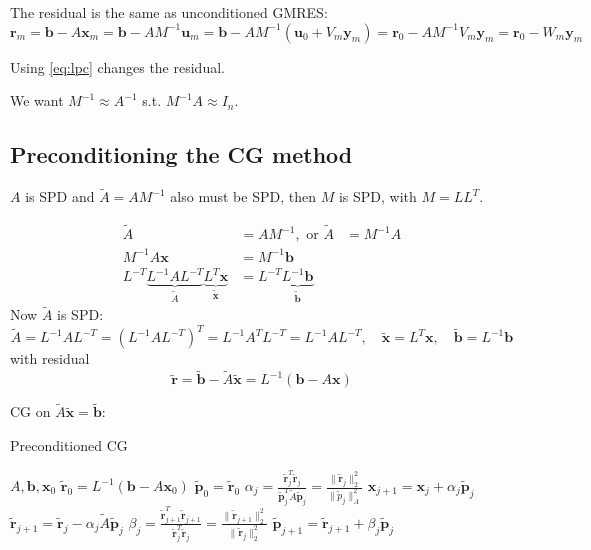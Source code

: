 The residual is the same as unconditioned GMRES:
\[
    \mathbf{r}_m = \mathbf{b} - A \mathbf{x}_m = \mathbf{b} - A M^{-1} \mathbf{u}_m = \mathbf{b} - A M^{-1} (\mathbf{u}_0 + V_m \mathbf{y}_m) = \mathbf{r}_0 - A M^{-1} V_m \mathbf{y}_m = \mathbf{r}_0 - W_m \mathbf{y}_m
\]

Using \eqref{eq:lpc} changes the residual.

We want $M^{-1} \approx A^{-1}$ s.t. $M^{-1} A \approx I_n$.

\subsection{Preconditioning the CG method}
$A$ is SPD and $\tilde{A} = A M^{-1}$ also must be SPD, then $M$ is SPD, with $M = L L^T$.


\begin{align*}
    \tilde{A} & = A M^{-1}, \text{ or } \tilde{A} &= M^{-1} A \\
    M^{-1}A \mathbf{x} & = M^{-1} \mathbf{b}\\
    L^{-T}\underbrace{L^{-1} A L^{-T}}_{\tilde{A}} \underbrace{L^T \mathbf{x}}_{\tilde{\mathbf{x}}} & = L^{-T} \underbrace{L^{-1} \mathbf{b}}_{\tilde{\mathbf{b}}}
\end{align*}
Now $\tilde{A}$ is SPD:
\[
    \tilde{A} = L^{-1} A L^{-T} = (L^{-1} A L^{-T})^T = L^{-1} A^T L^{-T} = L^{-1} A L^{-T}, \quad \tilde{\mathbf{x}} = L^T \mathbf{x}, \quad \tilde{\mathbf{b}} = L^{-1} \mathbf{b}
\]
with residual
\[
    \tilde{\mathbf{r}} = \tilde{\mathbf{b}} - \tilde{A} \tilde{\mathbf{x}} = L^{-1} (\mathbf{b} - A \mathbf{x})
\]

CG on $\tilde{A} \tilde{\mathbf{x}} = \tilde{\mathbf{b}}$:
\begin{algorithm}[H]
    \caption{Preconditioned CG}
    \begin{algorithmic}
        \Require
        \State $A, \mathbf{b}, \mathbf{x}_0$
        \State $\tilde{\mathbf{r}}_0 = L^{-1} (\mathbf{b} - A \mathbf{x}_0)$
        \State $\tilde{\mathbf{p}}_0 = \tilde{\mathbf{r}}_0$
        \State $\alpha_j = \frac{\tilde{\mathbf{r}}_j^T \tilde{\mathbf{r}}_j}{\tilde{\mathbf{p}}_j^T \tilde{A} \tilde{\mathbf{p}}_j} = \frac{\|\tilde{\mathbf{r}}_j\|_2^2}{\|\tilde{p}_j\|_A^2}$
        \State $\mathbf{x}_{j+1} = \mathbf{x}_j + \alpha_j \tilde{\mathbf{p}}_j$
        \State $\tilde{\mathbf{r}}_{j+1} = \tilde{\mathbf{r}}_j - \alpha_j \tilde{A} \tilde{\mathbf{p}}_j$
        \State $\beta_j = \frac{\tilde{\mathbf{r}}_{j+1}^T \tilde{\mathbf{r}}_{j+1}}{\tilde{\mathbf{r}}_j^T \tilde{\mathbf{r}}_j} = \frac{\|\tilde{\mathbf{r}}_{j+1}\|_2^2}{\|\tilde{\mathbf{r}}_j\|_2^2}$
        \State $\tilde{\mathbf{p}}_{j+1} = \tilde{\mathbf{r}}_{j+1} + \beta_j \tilde{\mathbf{p}}_j$
        \EndFor
    \end{algorithmic}
\end{algorithm}

